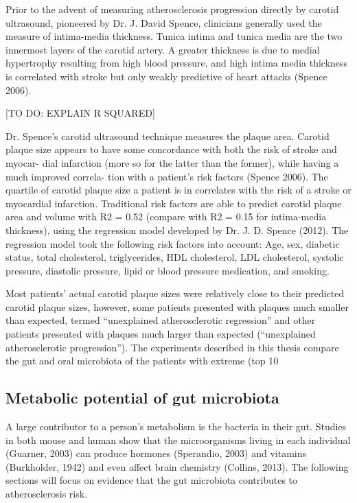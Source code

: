 Prior to the advent of measuring atherosclerosis progression directly by carotid ultrasound, pioneered by Dr. J. David Spence, clinicians generally used the measure of intima-media thickness. Tunica intima and tunica media are the two innermost layers of the carotid artery. A greater thickness is due to medial hypertrophy resulting from high blood pressure, and high intima media thickness is correlated with stroke but only weakly predictive of heart attacks (Spence 2006).

[TO DO: EXPLAIN R SQUARED]

Dr. Spence’s carotid ultrasound technique measures the plaque area. Carotid plaque size appears to have some concordance with both the risk of stroke and myocar-
dial infarction (more so for the latter than the former), while having a much improved correla-
tion with a patient’s risk factors (Spence 2006). The quartile of carotid plaque size a patient is in correlates with the risk of a stroke or myocardial infarction. Traditional risk factors are able to predict carotid plaque area and volume with R2 = 0.52 (compare with R2 = 0.15 for intima-media thickness), using the regression model developed by Dr. J. D. Spence (2012). The regression model took the following risk factors into account: Age, sex, diabetic status, total cholesterol, triglycerides, HDL cholesterol, LDL cholesterol, systolic pressure, diastolic pressure, lipid or blood pressure medication, and smoking.

Most patients’ actual carotid plaque sizes were relatively close to their predicted carotid plaque sizes, however, some patients presented with plaques much smaller than expected, termed “unexplained atherosclerotic regression” and other patients presented with plaques much larger than expected (“unexplained atherosclerotic progression”). The experiments described in this thesis compare the gut and oral microbiota of the patients with extreme (top 10%

\FloatBarrier

\subsection{Metabolic potential of gut microbiota}
A large contributor to a person’s metabolism is the bacteria in their gut. Studies in both mouse and human show that the microorganisms living in each individual (Guarner, 2003) can produce hormones (Sperandio, 2003) and vitamins (Burkholder, 1942) and even affect brain chemistry (Collins, 2013). The following sections will focus on evidence that the gut microbiota contributes to atherosclerosis risk.

